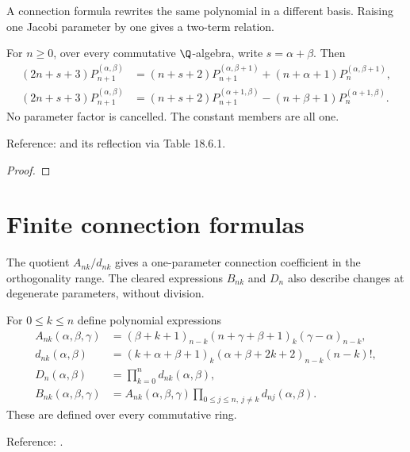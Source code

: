 A connection formula rewrites the same polynomial in a different basis. Raising one Jacobi parameter by one gives a two-term relation.

\begin{theorem}
\label{thm:jacobi-parameter-raising}
\leanok
For $n\ge0$, over every commutative $\Q$-algebra, write $s=\alpha+\beta$. Then
\begin{align*}
(2n+s+3)P_{n+1}^{(\alpha,\beta)}
 &= (n+s+2)P_{n+1}^{(\alpha,\beta+1)}+(n+\alpha+1)P_n^{(\alpha,\beta+1)},\\
(2n+s+3)P_{n+1}^{(\alpha,\beta)}
 &= (n+s+2)P_{n+1}^{(\alpha+1,\beta)}-(n+\beta+1)P_n^{(\alpha+1,\beta)}.
\end{align*}
No parameter factor is cancelled. The constant members are all one.

Reference: \cite[18.9.5]{dlmf} and its reflection via Table 18.6.1.
\end{theorem}
\begin{proof}
\leanok
\end{proof}

\section{Finite connection formulas}\label{sec:textbook-connections-connections}

The quotient $A_{nk}/d_{nk}$ gives a one-parameter connection coefficient in the orthogonality range. The cleared expressions $B_{nk}$ and $D_n$ also describe changes at degenerate parameters, without division.

\begin{definition}
\label{def:jacobi-connection-data}
\leanok
For $0\le k\le n$ define polynomial expressions
\begin{align*}
 A_{nk}(\alpha,\beta,\gamma)
   &=(\beta+k+1)_{n-k}(n+\gamma+\beta+1)_k(\gamma-\alpha)_{n-k},\\
 d_{nk}(\alpha,\beta)
   &=(k+\alpha+\beta+1)_k(\alpha+\beta+2k+2)_{n-k}(n-k)!,\\
 D_n(\alpha,\beta)&=\prod_{k=0}^n d_{nk}(\alpha,\beta),\\
 B_{nk}(\alpha,\beta,\gamma)
   &=A_{nk}(\alpha,\beta,\gamma)\prod_{0\le j\le n,\ j\ne k}d_{nj}(\alpha,\beta).
\end{align*}
These are defined over every commutative ring.

Reference: \cite[18.18.14]{dlmf}.
\end{definition}

